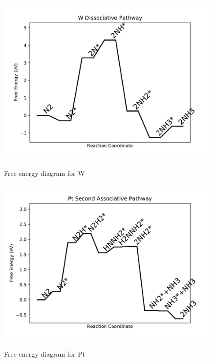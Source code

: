 \documentclass{article}
\begin{document}
\begin{figure}
\includegraphics[width=1\linewidth]{data/plots/W_dissociative.pdf}
\label{fig:W_dissociative}
\caption{Free energy diagram for W}
\end{figure}

\begin{figure}
\includegraphics[width=1\linewidth]{data/plots/Pt_associative_2.pdf}
\label{fig:Pt_associative_2}
\caption{Free energy diagram for Pt}
\end{figure}
\end{document}
